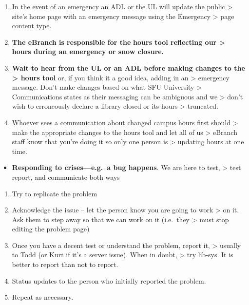 \documentclass[
  openany]{book}
\providecommand{\tightlist}{%
  \setlength{\itemsep}{0pt}\setlength{\parskip}{0pt}}
\begin{document}
\begin{enumerate}
\def\labelenumi{\arabic{enumi}.}
\item
  In the event of an emergency an ADL or the UL will update the public
  \textgreater{} site's home page with an emergency message using the Emergency
  \textgreater{} page content type.
\item
  \textbf{The eBranch is responsible for the} \textbf{hours tool reflecting our
  \textgreater{} hours during an emergency or snow closure. }
\item
  \textbf{Wait to hear from the UL or an ADL before making changes to the
  \textgreater{} hours tool} or, if you think it a good idea, adding in an
  \textgreater{} emergency message. Don't make changes based on what SFU University
  \textgreater{} Communications states as their messaging can be ambiguous and we
  \textgreater{} don't wish to erroneously declare a library closed or its hours
  \textgreater{} truncated.
\item
  Whoever sees a communication about changed campus hours first should
  \textgreater{} make the appropriate changes to the hours tool and let all of us
  \textgreater{} eBranch staff know that you're doing it so only one person is
  \textgreater{} updating hours at one time.
\end{enumerate}

\begin{itemize}
\tightlist
\item
  \textbf{Responding to crises---e.g.~a bug happens}. We are here to test,
  \textgreater{} test report, and communicate both ways
\end{itemize}

\begin{enumerate}
\def\labelenumi{\arabic{enumi}.}
\item
  Try to replicate the problem
\item
  Acknowledge the issue -- let the person know you are going to work
  \textgreater{} on it. Ask them to step away so that we can work on it (i.e.~they
  \textgreater{} must stop editing the problem page)
\item
  Once you have a decent test or understand the problem, report it,
  \textgreater{} usually to Todd (or Kurt if it's a server issue). When in doubt,
  \textgreater{} try lib-sys. It is better to report than not to report.
\item
  Status updates to the person who initially reported the problem.
\item
  Repeat as necessary.
\end{enumerate}
\end{document}

